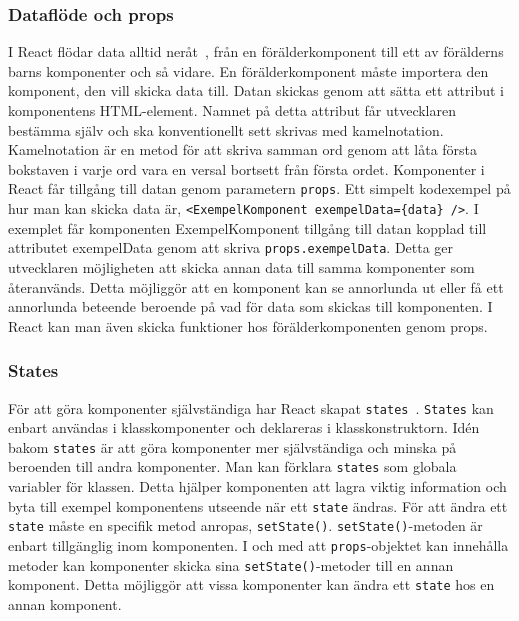 \subsubsection{Dataflöde och props}
I React flödar data alltid neråt~\cite{react-states}, från en förälderkomponent till ett av förälderns barns komponenter och så vidare. En förälderkomponent måste importera den komponent, den vill skicka data till. Datan skickas genom att sätta ett attribut i komponentens HTML-element. Namnet på detta attribut får utvecklaren bestämma själv och ska konventionellt sett skrivas med kamelnotation. Kamelnotation är en metod för att skriva samman ord genom att låta första bokstaven i varje ord vara en versal bortsett från första ordet. Komponenter i React får tillgång till datan genom parametern \texttt{props}. Ett simpelt kodexempel på hur man kan skicka data är, \texttt{<ExempelKomponent exempelData=\{data\} />}. I exemplet får komponenten ExempelKomponent tillgång till datan kopplad till attributet exempelData genom att skriva \texttt{props.exempelData}. Detta ger utvecklaren möjligheten att skicka annan data till samma komponenter som återanvänds. Detta möjliggör att en komponent kan se annorlunda ut eller få ett annorlunda beteende beroende på vad för data som skickas till komponenten. I React kan man även skicka funktioner hos förälderkomponenten genom props. 

\subsubsection{States}
\label{axel:react-states} 
För att göra komponenter självständiga har React skapat \texttt{states}~\cite{react-states}. \texttt{States} kan enbart användas i klasskomponenter och deklareras i klasskonstruktorn. Idén bakom \texttt{states} är att göra komponenter mer självständiga och minska på beroenden till andra komponenter. Man kan förklara \texttt{states} som globala variabler för klassen. Detta hjälper komponenten att lagra viktig information och byta till exempel komponentens utseende när ett \texttt{state} ändras. För att ändra ett \texttt{state} måste en specifik metod anropas, \texttt{setState()}. \texttt{setState()}-metoden är enbart tillgänglig inom komponenten. I och med att \texttt{props}-objektet kan innehålla metoder kan komponenter skicka sina \texttt{setState()}-metoder till en annan komponent. Detta möjliggör att vissa komponenter kan ändra ett \texttt{state} hos en annan komponent.


